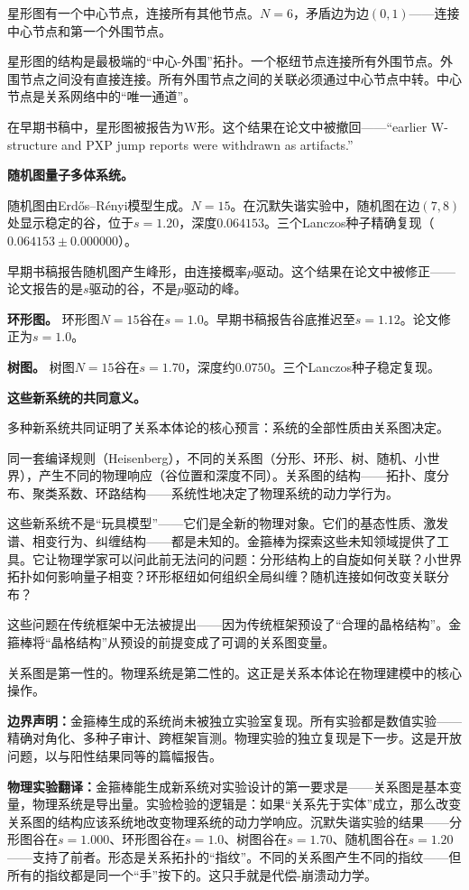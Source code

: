 \documentclass[11pt,a4paper]{book}
\theoremstyle{definition}
\begin{document}
星形图有一个中心节点，连接所有其他节点。$N=6$，矛盾边为边$(0,1)$——连接中心节点和第一个外围节点。

星形图的结构是最极端的“中心-外围”拓扑。一个枢纽节点连接所有外围节点。外围节点之间没有直接连接。所有外围节点之间的关联必须通过中心节点中转。中心节点是关系网络中的“唯一通道”。

在早期书稿中，星形图被报告为W形。这个结果在论文中被撤回——“earlier W-structure and PXP jump reports were withdrawn as artifacts.”

\textbf{随机图量子多体系统。}

随机图由Erdős–Rényi模型生成。$N=15$。在沉默失谐实验中，随机图在边$(7,8)$处显示稳定的谷，位于$s=1.20$，深度$0.064153$。三个Lanczos种子精确复现（$0.064153\pm0.000000$）。

早期书稿报告随机图产生峰形，由连接概率$p$驱动。这个结果在论文中被修正——论文报告的是$s$驱动的谷，不是$p$驱动的峰。

\textbf{环形图。} 环形图$N=15$谷在$s=1.0$。早期书稿报告谷底推迟至$s=1.12$。论文修正为$s=1.0$。

\textbf{树图。} 树图$N=15$谷在$s=1.70$，深度约$0.0750$。三个Lanczos种子稳定复现。

\textbf{这些新系统的共同意义。}

多种新系统共同证明了关系本体论的核心预言：系统的全部性质由关系图决定。

同一套编译规则（Heisenberg），不同的关系图（分形、环形、树、随机、小世界），产生不同的物理响应（谷位置和深度不同）。关系图的结构——拓扑、度分布、聚类系数、环路结构——系统性地决定了物理系统的动力学行为。

这些新系统不是“玩具模型”——它们是全新的物理对象。它们的基态性质、激发谱、相变行为、纠缠结构——都是未知的。金箍棒为探索这些未知领域提供了工具。它让物理学家可以问此前无法问的问题：分形结构上的自旋如何关联？小世界拓扑如何影响量子相变？环形枢纽如何组织全局纠缠？随机连接如何改变关联分布？

这些问题在传统框架中无法被提出——因为传统框架预设了“合理的晶格结构”。金箍棒将“晶格结构”从预设的前提变成了可调的关系图变量。

关系图是第一性的。物理系统是第二性的。这正是关系本体论在物理建模中的核心操作。

\textbf{边界声明：}金箍棒生成的系统尚未被独立实验室复现。所有实验都是数值实验——精确对角化、多种子审计、跨框架盲测。物理实验的独立复现是下一步。这是开放问题，以与阳性结果同等的篇幅报告。

\textbf{物理实验翻译：}金箍棒能生成新系统对实验设计的第一要求是——关系图是基本变量，物理系统是导出量。实验检验的逻辑是：如果“关系先于实体”成立，那么改变关系图的结构应该系统地改变物理系统的动力学响应。沉默失谐实验的结果——分形图谷在$s=1.000$、环形图谷在$s=1.0$、树图谷在$s=1.70$、随机图谷在$s=1.20$——支持了前者。形态是关系拓扑的“指纹”。不同的关系图产生不同的指纹——但所有的指纹都是同一个“手”按下的。这只手就是代偿-崩溃动力学。
\end{document}

